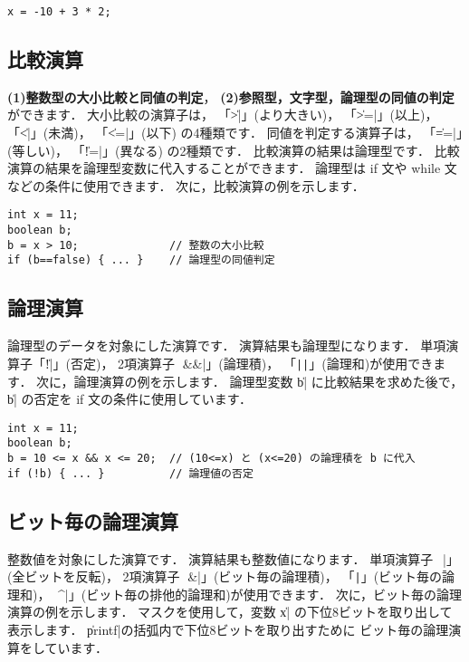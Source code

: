 \begin{mylist}
\begin{verbatim}
x = -10 + 3 * 2;
\end{verbatim}
\end{mylist}

\subsection{比較演算}

{\bf (1)整数型の大小比較と同値の判定}，
{\bf (2)参照型，文字型，論理型の同値の判定}ができます．
大小比較の演算子は，
「\|>|」(より大きい)，
「\|>=|」(以上)，
「\|<|」(未満)，
「\|<=|」(以下) の4種類です．
同値を判定する演算子は，
「\|==|」(等しい)，
「\|!=|」(異なる)
の2種類です．
比較演算の結果は論理型です．
比較演算の結果を論理型変数に代入することができます．
論理型は if 文や while 文などの条件に使用できます．
次に，比較演算の例を示します．

\begin{mylist}
\begin{verbatim}
int x = 11;
boolean b;
b = x > 10;              // 整数の大小比較
if (b==false) { ... }    // 論理型の同値判定
\end{verbatim}
\end{mylist}

\subsection{論理演算}

論理型のデータを対象にした演算です．
演算結果も論理型になります．
単項演算子「\|!|」(否定)，
2項演算子
「\|&&|」(論理積)，
「\verb/||/」(論理和)が使用できます．
次に，論理演算の例を示します．
論理型変数 \|b| に比較結果を求めた後で，
\|b| の否定を if 文の条件に使用しています．

\begin{mylist}
\begin{verbatim}
int x = 11;
boolean b;
b = 10 <= x && x <= 20;  // (10<=x) と (x<=20) の論理積を b に代入
if (!b) { ... }          // 論理値の否定
\end{verbatim}
\end{mylist}

\subsection{ビット毎の論理演算}

整数値を対象にした演算です．
演算結果も整数値になります．
単項演算子「\|~|」(全ビットを反転)，
2項演算子
「\|&|」(ビット毎の論理積)，
「\verb/|/」(ビット毎の論理和)，
「\|^|」(ビット毎の排他的論理和)が使用できます．
次に，ビット毎の論理演算の例を示します．
マスクを使用して，変数 \|x| の下位8ビットを取り出して表示します．
\|printf|の括弧内で下位8ビットを取り出すために
ビット毎の論理演算をしています．

